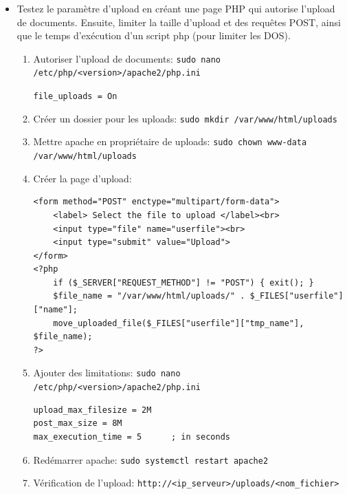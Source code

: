 \documentclass[a4paper]{article}
\begin{document}
\begin{itemize}
\item Testez le paramètre d’upload en créant une page PHP qui autorise l’upload de documents. Ensuite, limiter la taille d'upload et des requêtes POST, ainsi que le temps d'exécution d'un script php (pour limiter les DOS).
\begin{example}
    \begin{enumerate}
        \item Autoriser l'upload de documents: \texttt{sudo nano /etc/php/<version>/apache2/php.ini}
        \begin{example}
            \texttt{file\_uploads = On}
        \end{example}
        \item Créer un dossier pour les uploads: \texttt{sudo mkdir /var/www/html/uploads}
        \item Mettre apache en propriétaire de uploads: \texttt{sudo chown www-data /var/www/html/uploads}
        \item Créer la page d'upload:
\begin{lstlisting}[style=php]
<form method="POST" enctype="multipart/form-data">
    <label> Select the file to upload </label><br>
    <input type="file" name="userfile"><br>
    <input type="submit" value="Upload">
</form>
<?php
    if ($_SERVER["REQUEST_METHOD"] != "POST") { exit(); }
    $file_name = "/var/www/html/uploads/" . $_FILES["userfile"]["name"];
    move_uploaded_file($_FILES["userfile"]["tmp_name"], $file_name);
?>
\end{lstlisting}
        \item Ajouter des limitations: \texttt{sudo nano /etc/php/<version>/apache2/php.ini}
\begin{example} \begin{verbatim}
upload_max_filesize = 2M
post_max_size = 8M
max_execution_time = 5      ; in seconds
\end{verbatim} \end{example}
        \item Redémarrer apache: \texttt{sudo systemctl restart apache2}
        \item Vérification de l'upload: \texttt{http://<ip\_serveur>/uploads/<nom\_fichier>}
    \end{enumerate}
\end{example}


\end{itemize}
\end{document}
